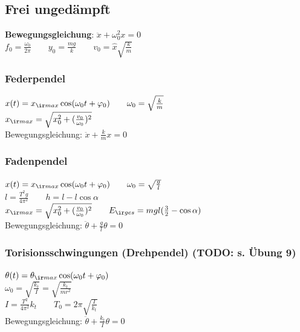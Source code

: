\begin{sectionbox}
    \subsection{Frei ungedämpft}
    \textbf{Bewegungsgleichung}: $\ddot{x}+\omega_0^2x=0$\\
    $f_0=\frac{\omega_0}{2\pi} \qquad y_0=\frac{mg}{k} \qquad v_0 = \hat{x}\sqrt{\frac{k}{m}}$

    \subsubsection{Federpendel}
    $x(t)=x_{\ir max}\cos (\omega_0 t + \varphi_0) \qquad \omega_0 = \sqrt{\frac{k}{m}}$\\
    $x_{\ir max}=\sqrt{x_0^2+(\frac{v_0}{\omega_0})^2}$\\
    Bewegungsgleichung: $\ddot{x}+\frac{k}{m}x=0$

    \subsubsection{Fadenpendel}
    $x(t)=x_{\ir max}\cos (\omega_0 t + \varphi_0) \qquad \omega_0 = \sqrt\frac{g}{l}$\\
    $l=\frac{T^2g}{4\pi^2} \qquad h=l-l\cos \alpha$\\
    $x_{\ir max}=\sqrt{x_0^2+(\frac{v_0}{\omega_0})^2} \qquad E_{\ir ges} = mgl(\frac{3}{2}-\cos \alpha)$\\
    Bewegungsgleichung: $\ddot{\theta}+\frac{g}{l}\theta=0$

    \subsubsection{Torisionsschwingungen (Drehpendel) (TODO: s. Übung 9)}
    $\theta(t)=\theta_{\ir max}\cos(\omega_0 t + \varphi_0)$ \\
    $\omega_0 = \sqrt{\frac{k_t}{I}}=\sqrt{\frac{k_t}{mr^2}}$\\
    $I=\frac{T^2}{4\pi^2}k_t \qquad T_0=2\pi \sqrt{\frac{I}{k_t}}$\\
    Bewegungsgleichung: $\ddot{\theta}+\frac{k_t}{I}\theta=0$
\end{sectionbox}

